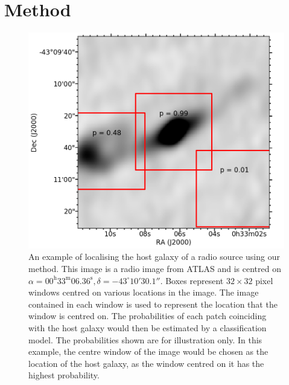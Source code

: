 \documentclass[fleqn,usenatbib,usedcolumn]{mnras}
\begin{document}
  \section{Method}\label{sec:method}
    \begin{figure}
      \centering
      \includegraphics[width=\columnwidth]{images/fig2-jkb.png}
      \caption{An example of localising the host galaxy of a radio source using
        our method. This image is a radio image from ATLAS and is centred on
        $\alpha = 00^\text{h}33^\text{m}06.36^\text{s}, \delta =
        -43^\circ{}10'30.1''$. Boxes represent $32 \times 32$ pixel windows
        centred on various locations in the image. The image contained in each
        window is used to represent the location that the window is centred
        on. The probabilities of each patch coinciding with the host galaxy
        would then be estimated by a classification model. The probabilities
        shown are for illustration only. In this example, the centre window of
        the image would be chosen as the location of the host galaxy, as the
        window centred on it has the highest probability.}
      \label{fig:windows}
    \end{figure}
\end{document}
